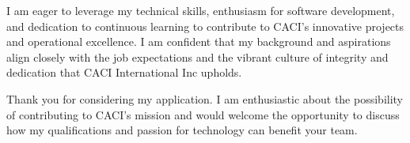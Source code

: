 \documentclass[]{cover}
\begin{document}
I am eager to leverage my technical skills, enthusiasm for software development, and dedication to continuous learning to contribute to CACI's innovative projects and operational excellence. I am confident that my background and aspirations align closely with the job expectations and the vibrant culture of integrity and dedication that CACI International Inc upholds.

Thank you for considering my application. I am enthusiastic about the possibility of contributing to CACI's mission and would welcome the opportunity to discuss how my qualifications and passion for technology can benefit your team. 


\signature{Adem Mcharek}
\end{document}
